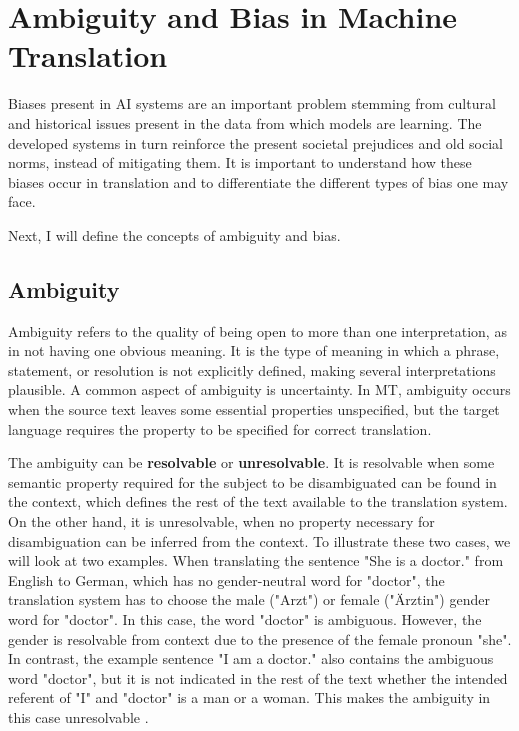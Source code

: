 
\section{Ambiguity and Bias in Machine Translation}
\label{sec:Background:Ambiguity_Bias}
Biases present in AI systems are an important problem stemming from cultural and historical issues present in the data from which models are learning. The developed systems in turn reinforce the present societal prejudices and old social norms, instead of mitigating them. 
It is important to understand how these biases occur in translation and to differentiate the different types of bias one may face.

Next, I will define the concepts of ambiguity and bias.

\subsection{Ambiguity}
\label{sec:Background:Ambiguity}
Ambiguity refers to the quality of being open to more than one interpretation, as in not having one obvious meaning. It is the type of meaning in which a phrase, statement, or resolution is not explicitly defined, making several interpretations plausible. A common aspect of ambiguity is uncertainty. In MT, ambiguity occurs when the source text leaves some essential properties unspecified, but the target language requires the property to be specified for correct translation. 

The ambiguity can be \textbf{resolvable} or \textbf{unresolvable}. It is resolvable when some semantic property required for the subject to be disambiguated can be found in the context, which defines the rest of the text available to the translation system. On the other hand, it is unresolvable, when no property necessary for disambiguation can be inferred from the context. To illustrate these two cases, we will look at two examples. When translating the sentence "She is a doctor." from English to German, which has no gender-neutral word for "doctor", the translation system has to choose the male ("Arzt") or female ("Ärztin") gender word for "doctor". In this case, the word "doctor" is ambiguous. However, the gender is resolvable from context due to the presence of the female pronoun "she". In contrast, the example sentence "I am a doctor." also contains the ambiguous word "doctor", but it is not indicated in the rest of the text whether the intended referent of "I" and "doctor" is a man or a woman. This makes the ambiguity in this case unresolvable \parencite{bias_taxonomy}.

